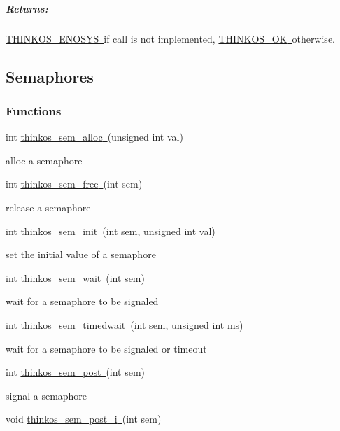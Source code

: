 {\subparagraph{\texorpdfstring{{Returns:}}{Returns:}}\label{returns-22}

{\protect\hyperlink{h.3s49zyc}{THINKOS\_ENOSYS}}{\protect\hyperlink{h.3s49zyc}{~}}{if
call is not implemented,
}{\protect\hyperlink{h.2fk6b3p}{THINKOS\_OK}}{\protect\hyperlink{h.2fk6b3p}{~}}{otherwise.
}

\paragraph{\texorpdfstring{{}}{}}\label{section-3}

\subsection{\texorpdfstring{{Semaphores}}{Semaphores}}\label{semaphores}

\subsubsection{\texorpdfstring{{Functions}}{Functions}}\label{h.49x2ik5}

{int
}{\protect\hyperlink{h.2p2csry}{thinkos\_sem\_alloc}}{\protect\hyperlink{h.2p2csry}{~}}{(unsigned
int val)}

{alloc a semaphore }

{int
}{\protect\hyperlink{h.147n2zr}{thinkos\_sem\_free}}{\protect\hyperlink{h.147n2zr}{~}}{(int
sem)}

{release a semaphore }

{int
}{\protect\hyperlink{h.3o7alnk}{thinkos\_sem\_init}}{\protect\hyperlink{h.3o7alnk}{~}}{(int
sem, unsigned int val)}

{set the initial value of a semaphore }

{int
}{\protect\hyperlink{h.23ckvvd}{thinkos\_sem\_wait}}{\protect\hyperlink{h.23ckvvd}{~}}{(int
sem)}

{wait for a semaphore to be signaled }

{int
}{\protect\hyperlink{h.ihv636}{thinkos\_sem\_timedwait}}{\protect\hyperlink{h.ihv636}{~}}{(int
sem, unsigned int ms)}

{wait for a semaphore to be signaled or timeout }

{int
}{\protect\hyperlink{h.32hioqz}{thinkos\_sem\_post}}{\protect\hyperlink{h.32hioqz}{~}}{(int
sem)}

{signal a semaphore }

{void
}{\protect\hyperlink{h.1hmsyys}{thinkos\_sem\_post\_i}}{\protect\hyperlink{h.1hmsyys}{~}}{(int
sem)}

}
